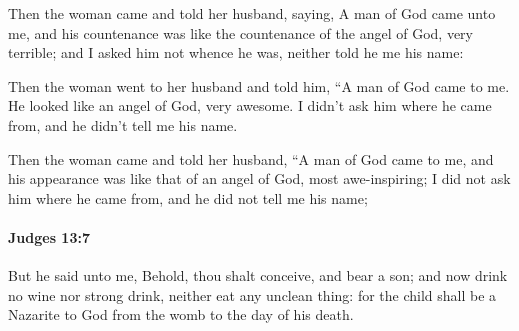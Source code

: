 			\begin{versebox}
					\item[BHS] 
					\item[ASV] Then the woman came and told her husband, saying, A man of God came unto me, and his countenance was like the countenance of the angel of God, very terrible; and I asked him not whence he was, neither told he me his name:
					\item[NIV] Then the woman went to her husband and told him, “A man of God came to me. He looked like an angel of God, very awesome. I didn’t ask him where he came from, and he didn’t tell me his name.
					\item[NRSV] Then the woman came and told her husband, “A man of God came to me, and his appearance was like that of an angel of God, most awe-inspiring; I did not ask him where he came from, and he did not tell me his name;
			\end{versebox}

		\paragraph{Judges 13:7} %
			\label{JUDGES-13-7}

			But he said unto me, Behold, thou shalt conceive, and bear a son; and now drink no wine nor strong drink, neither eat any unclean thing: for the child shall be a Nazarite to God from the womb to the day of his death.

